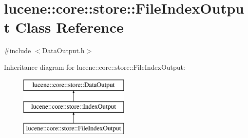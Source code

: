 \hypertarget{classlucene_1_1core_1_1store_1_1FileIndexOutput}{}\section{lucene\+:\+:core\+:\+:store\+:\+:File\+Index\+Output Class Reference}
\label{classlucene_1_1core_1_1store_1_1FileIndexOutput}


{\ttfamily \#include $<$Data\+Output.\+h$>$}

Inheritance diagram for lucene\+:\+:core\+:\+:store\+:\+:File\+Index\+Output\+:\begin{figure}[H]
\begin{center}
\leavevmode
\includegraphics[height=3.000000cm]{classlucene_1_1core_1_1store_1_1FileIndexOutput}
\end{center}
\end{figure}
